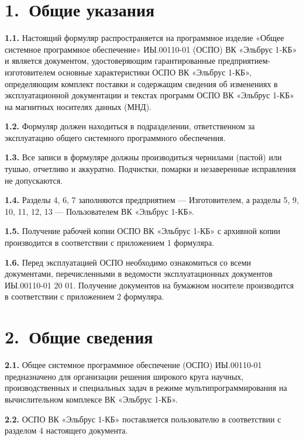 \documentclass[11pt,a4paper]{article}
\begin{document}
\section*{1.~Общие указания}
\par\textbf{1.1.} Настоящий формуляр распространяется на программное изделие «Общее системное программное обеспечение» ИЫ.00110-01 (ОСПО) ВК «Эльбрус 1-КБ» и является документом, удостоверяющим гарантированные предприятием-изготовителем основные характеристики ОСПО ВК «Эльбрус 1-КБ», определяющим комплект поставки и содержащим сведения об изменениях в эксплуатационной документации и текстах программ ОСПО ВК «Эльбрус 1-КБ» на магнитных носителях данных (МНД).\par
\par\textbf{1.2.} Формуляр должен находиться в подразделении, ответственном за эксплуатацию общего системного программного обеспечения.\par
\par\textbf{1.3.} Все записи в формуляре должны производиться чернилами (пастой) или тушью, отчетливо и аккуратно. Подчистки, помарки и незаверенные исправления не допускаются.\par
\par\textbf{1.4.} Разделы 4, 6, 7 заполняются предприятием --- Изготовителем, а разделы 5, 9, 10, 11, 12, 13 --- Пользователем ВК «Эльбрус 1-КБ».\par
\par\textbf{1.5.} Получение рабочей копии ОСПО ВК «Эльбрус 1-КБ» с архивной копии производится в соответствии с приложением 1 формуляра.\par
\par\textbf{1.6.} Перед эксплуатацией ОСПО необходимо ознакомиться со всеми документами, перечисленными в ведомости эксплуатационных документов ИЫ.00110-01 20 01. Получение документов на бумажном носителе производится в соответствии с приложением 2 формуляра.\par
\section*{2.~Общие сведения}
\par\textbf{2.1.} Общее системное программное обеспечение (ОСПО) ИЫ.00110-01 предназначено для организации решения широкого круга научных, производственных и специальных задач в режиме мультипрограммирования на вычислительном комплексе ВК «Эльбрус 1-КБ».\par
\par\textbf{2.2.} ОСПО ВК «Эльбрус 1-КБ» поставляется пользователю в соответствии с разделом 4 настоящего документа.\par
\end{document}
